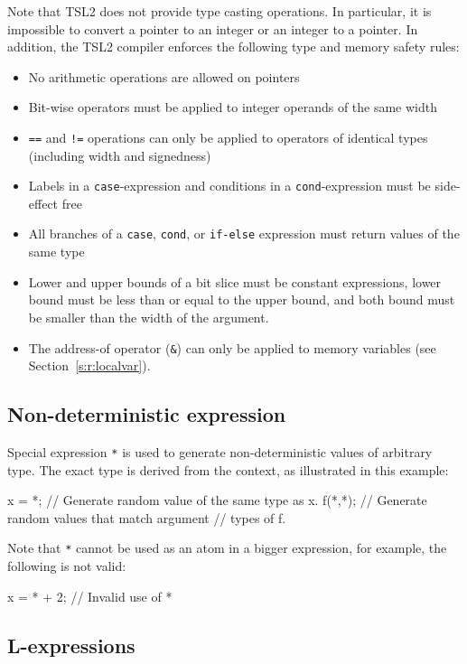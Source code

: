 \documentclass{report}
\newcommand{\src}[1]{\texttt{#1}}
\newcommand{\tsl}{TSL2 }
\begin{document}
Note that \tsl does not provide type casting operations.  In 
particular, it is impossible to convert a pointer to an integer or 
an integer to a pointer.  In addition, the \tsl compiler enforces the 
following type and memory safety rules:
\begin{itemize}
    \item No arithmetic operations are allowed on pointers
    \item Bit-wise operators must be applied to integer operands 
        of the same width
    \item \src{==} and \src{!=} operations can only be applied to 
        operators of identical types (including width and 
        signedness)
    \item Labels in a \src{case}-expression and conditions in a 
        \src{cond}-expression must be side-effect free
    \item All branches of a \src{case}, \src{cond}, or \src{if-else}
        expression must return values of the same type
    \item Lower and upper bounds of a bit slice must be constant 
        expressions, lower bound must be less than or equal to the 
        upper bound, and both bound must be smaller than the width
        of the argument.
    \item The address-of operator (\src{\&}) can only be applied 
        to memory variables (see Section~\ref{s:r:localvar}).
\end{itemize}

\subsection{Non-deterministic expression}

Special expression \src{*} is used to generate non-deterministic 
values of arbitrary type.  The exact type is derived from the 
context, as illustrated in this example:
\begin{tsllisting}{}
x = *;  // Generate random value of the same type as x.
f(*,*); // Generate random values that match argument 
        // types of f.
\end{tsllisting}
Note that \src{*} cannot be used as an atom in a bigger expression,
for example, the following is not valid:
\begin{tsllisting}{}
x = * + 2; // Invalid use of *
\end{tsllisting}

\subsection{L-expressions}\label{s:r:lexpr}
\end{document}
